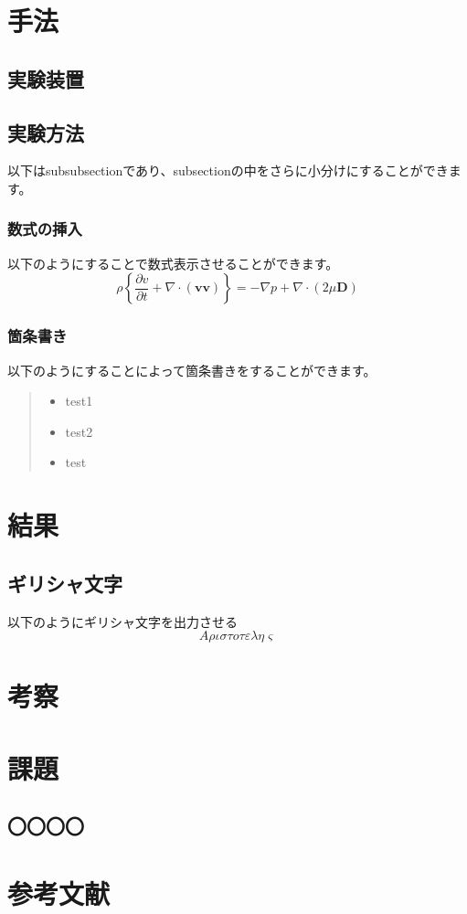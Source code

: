 \documentclass{jarticle}
\begin{document}
\newpage%


\section{手法}
\subsection{実験装置}
\subsection{実験方法}
以下はsubsubsectionであり、subsectionの中をさらに小分けにすることができます。
\subsubsection{数式の挿入}
以下のようにすることで数式表示させることができます。
$$
\rho\left\{\frac{\partial v}{\partial t}+\nabla \cdot(\boldsymbol{v} \boldsymbol{v})\right\}=-\nabla p+\nabla \cdot(2 \mu \boldsymbol{D})
$$

\subsubsection{箇条書き}
以下のようにすることによって箇条書きをすることができます。
\begin{quote}
 \begin{itemize}
  \item test1
  \item test2
  \item test
 \end{itemize}
\end{quote}
\section{結果}
\subsection{ギリシャ文字}
以下のようにギリシャ文字を出力させる
$$A\rho\iota\sigma\tau{}o\tau\varepsilon\lambda\eta\varsigma$$




\section{考察}

\section{課題}
\subsection{〇〇〇〇}

\section{参考文献}
 
\end{document}
